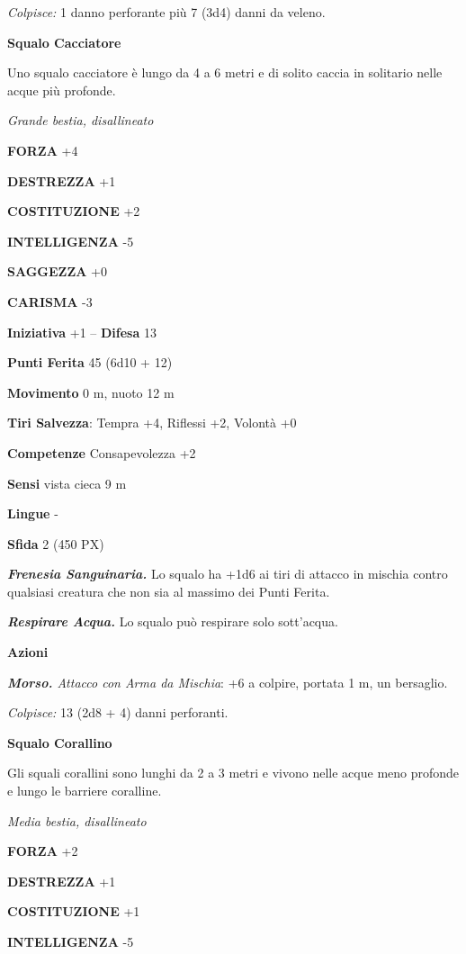 \begin{multicols}{2}
	\textit{Colpisce:} 1 danno perforante più 7 (3d4) danni da veleno.

	\medskip\textbf{Squalo Cacciatore}

	Uno squalo cacciatore è lungo da 4 a 6 metri e di solito caccia in solitario nelle acque più profonde.

	\textit{Grande bestia, disallineato}

	\textbf{FORZA} +4

	\textbf{DESTREZZA} +1

	\textbf{COSTITUZIONE} +2

	\textbf{INTELLIGENZA} -5

	\textbf{SAGGEZZA} +0

	\textbf{CARISMA} -3

	\textbf{Iniziativa} +1 -- \textbf{Difesa} 13

	\textbf{Punti Ferita} 45 (6d10 + 12)

	\textbf{Movimento} 0 m, nuoto 12 m

	\textbf{Tiri Salvezza}: Tempra +4, Riflessi +2, Volontà +0

	\textbf{Competenze} Consapevolezza +2

	\textbf{Sensi} vista cieca 9 m

	\textbf{Lingue} -

	\textbf{Sfida} 2 (450 PX)

	\textit{\textbf{Frenesia Sanguinaria.}} Lo squalo ha +1d6 ai tiri di attacco in mischia contro qualsiasi creatura che non sia al massimo dei Punti Ferita.

	\textit{\textbf{Respirare Acqua.}} Lo squalo può respirare solo sott'acqua.

	\textbf{Azioni}

	\textit{\textbf{Morso.} Attacco con Arma da Mischia}: +6 a colpire, portata 1 m, un bersaglio.

	\textit{Colpisce:} 13 (2d8 + 4) danni perforanti.

	\medskip\textbf{Squalo Corallino}

	Gli squali corallini sono lunghi da 2 a 3 metri e vivono nelle acque meno profonde e lungo le barriere coralline.

	\textit{Media bestia, disallineato}

	\textbf{FORZA} +2

	\textbf{DESTREZZA} +1

	\textbf{COSTITUZIONE} +1

	\textbf{INTELLIGENZA} -5


\end{multicols}
